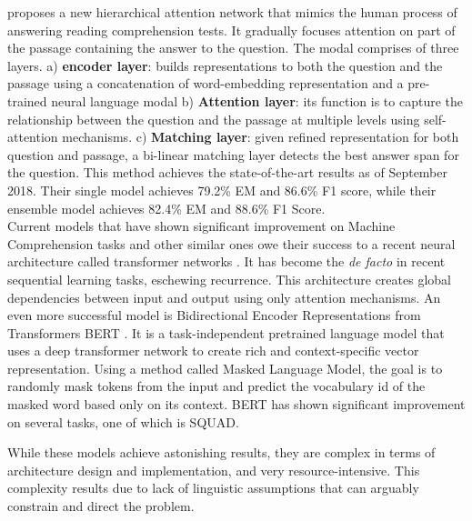 \citep{DBLP:journals/corr/abs-1811-11934} proposes a new hierarchical attention network that mimics the human process of answering reading comprehension tests. It gradually focuses attention on part of the passage containing the answer to the question. The modal comprises of three layers. a) \textbf{encoder layer}: builds representations to both the question and the passage using a concatenation of word-embedding representation \citep{pennington2014glove} and a pre-trained neural language modal \citep{Peters:2018} b) \textbf{Attention layer}: its function is to capture the relationship between the question and the passage at multiple levels using self-attention mechanisms. c) \textbf{Matching layer}: given refined representation for both question and passage, a bi-linear matching layer detects the best answer span for the question. This method achieves the state-of-the-art results as of September 2018. Their single model achieves 79.2\% EM and 86.6\% F1 score, while their ensemble model achieves 82.4\% EM and 88.6\% F1 Score. \\

Current models that have shown significant improvement on Machine Comprehension tasks and other similar ones owe their success to a recent neural architecture called transformer networks \citep{DBLP:journals/corr/VaswaniSPUJGKP17}. It has become the \emph{de facto} in recent sequential learning tasks, eschewing recurrence. This architecture creates global dependencies between input and output using only attention mechanisms. An even more successful model is Bidirectional Encoder Representations from Transformers BERT \citep{DBLP:journals/corr/abs-1810-04805}. It is a task-independent pretrained language model that uses a deep transformer network to create rich and context-specific vector representation. Using a method called Masked Language Model, the goal is to randomly mask tokens from the input and predict the vocabulary id of the masked word based only on its context. BERT has shown significant improvement on several tasks, one of which is SQUAD. 


While these models achieve astonishing results, they are  complex in terms of architecture design and implementation, and very resource-intensive. This complexity results due to  lack of linguistic assumptions that can arguably constrain and direct the problem. 


